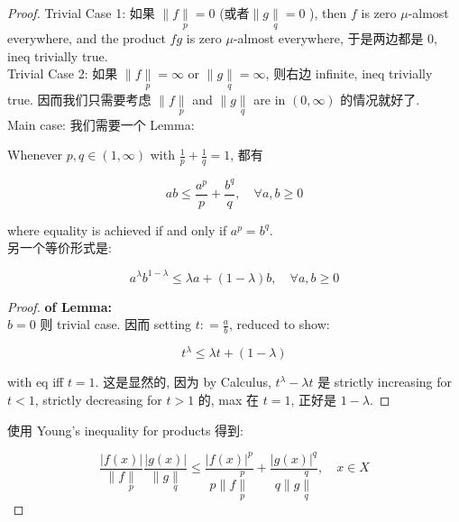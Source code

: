 \begin{proof}

Trivial Case 1: 如果 \(\parallel f\underset{p}{\parallel} = 0\) (或者\(\parallel g\underset{q}{\parallel} = 0\) ), then \(f\) is zero \(\mu\)-almost everywhere, and the product \(fg\) is zero \(\mu\)-almost everywhere, 于是两边都是 \(0\), ineq trivially true.\\
Trivial Case 2: 如果 \(\parallel f\underset{p}{\parallel} = \infty\) or \(\parallel g\underset{q}{\parallel} = \infty\), 则右边 infinite, ineq trivially true. 因而我们只需要考虑 \(\parallel f\underset{p}{\parallel}\) and \(\parallel g\underset{q}{\parallel}\) are in \((0,\infty)\) 的情况就好了.\\
Main case: 我们需要一个 Lemma:

\begin{lemma}{}

Whenever \(p,q \in (1,\infty)\) with \(\frac{1}{p} + \frac{1}{q} = 1\), 都有

\[ab \leq \frac{a^{p}}{p} + \frac{b^{q}}{q},\quad\forall a,b \geq 0\]

where equality is achieved if and only if \(a^{p} = b^{q}\).\\
另一个等价形式是:

\[a^{\lambda}b^{1 - \lambda} \leq \lambda a + (1 - \lambda)b,\quad\forall a,b \geq 0\]

\end{lemma}

\begin{proof}

\textbf{of Lemma:}\\
\(b = 0\) 则 trivial case. 因而 setting \(t: = \frac{a}{b}\), reduced to show:

\[t^{\lambda} \leq \lambda t + (1 - \lambda)\]

with eq iff \(t = 1\). 这是显然的, 因为 by Calculus, \(t^{\lambda} - \lambda t\) 是 strictly increasing for \(t < 1\), strictly decreasing for \(t > 1\) 的, max 在 \(t = 1\), 正好是 \(1 - \lambda\).

\end{proof}

使用 Young's inequality for products 得到:

\[\frac{|f(x)|}{\parallel f\underset{p}{\parallel}}\frac{|g(x)|}{\parallel g\underset{q}{\parallel}} \leq \frac{|f(x)|^{p}}{p \parallel f\underset{p}{\overset{p}{\parallel}}} + \frac{|g(x)|^{q}}{q \parallel g\underset{q}{\overset{q}{\parallel}}},\quad x \in X\]


\end{proof}
